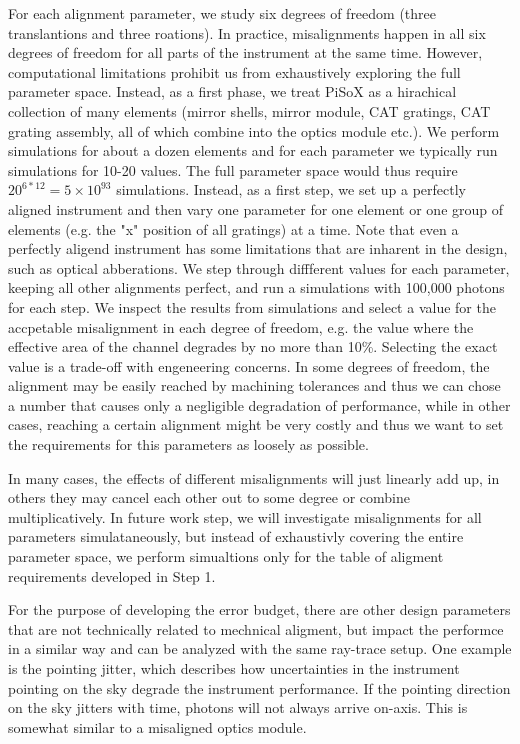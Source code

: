 \documentclass[]{spie}  %
\begin{document}
For each alignment parameter, we study six degrees of freedom (three translantions and three roations). In practice, misalignments happen in all six degrees of freedom for all parts of the instrument at the same time. However, computational limitations prohibit us from exhaustively exploring the full parameter space. Instead, as a first phase, we treat PiSoX as a hirachical collection of many elements (mirror shells, mirror module, CAT gratings, CAT grating assembly, all of which combine into the optics module etc.). We perform simulations for about a dozen elements and for each parameter we typically run simulations for 10-20 values. The full parameter space would thus require $20^{6*12}=5\times 10^{93}$ simulations. Instead, as a first step, we set up a perfectly aligned instrument and then vary one parameter for one element or one group of elements (e.g. the "x" position of all gratings) at a time. Note that even a perfectly aligend instrument has some limitations that are inharent in the design, such as optical abberations. We step through diffferent values for each parameter, keeping all other alignments perfect, and run a simulations with 100,000 photons for each step. We inspect the results from simulations and select a value for the accpetable misalignment in each degree of freedom, e.g. the value where the effective area of the channel degrades by no more than 10\%. Selecting the exact value is a trade-off with engeneering concerns. In some degrees of freedom, the alignment may be easily reached by machining tolerances and thus we can chose a number that causes only a negligible degradation of performance, while in other cases, reaching a certain alignment might be very costly and thus we want to set the requirements for this parameters as loosely as possible.

In many cases, the effects of different misalignments will just linearly add up, in others they may cancel each other out to some degree or combine multiplicatively. In future work step, we will investigate misalignments for all parameters simulataneously, but instead of exhaustivly covering the entire parameter space, we perform simualtions only for the table of aligment requirements developed in Step 1.

For the purpose of developing the error budget, there are other design parameters that are not technically related to mechnical aligment, but impact the performce in a similar way and can be analyzed with the same ray-trace setup. One example is the pointing jitter, which describes how uncertainties in the instrument pointing on the sky degrade the instrument performance. If the pointing direction on the sky jitters with time, photons will not always arrive on-axis. This is somewhat similar to a misaligned optics module.
\end{document}
